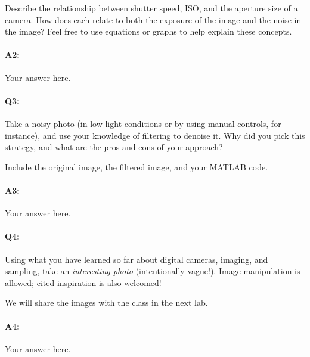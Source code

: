 Describe the relationship between shutter speed, ISO, and the aperture size of a camera. How does each relate to both the exposure of the image and the noise in the image? Feel free to use equations or graphs to help explain these concepts.

\paragraph{A2:} Your answer here.



\pagebreak
\paragraph{Q3:} 
Take a noisy photo (in low light conditions or by using manual controls, for instance), and use your knowledge of filtering to denoise it. Why did you pick this strategy, and what are the pros and cons of your approach?

Include the original image, the filtered image, and your MATLAB code.

\paragraph{A3:} Your answer here.




\pagebreak
\paragraph{Q4:} 

Using what you have learned so far about digital cameras, imaging, and sampling, take an \emph{interesting photo} (intentionally vague!). Image manipulation is allowed; cited inspiration is also welcomed! 

We will share the images with the class in the next lab.

\paragraph{A4:} Your answer here.









